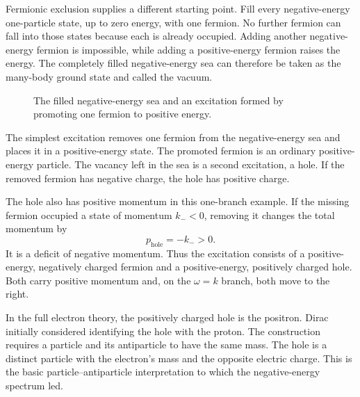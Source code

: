 Fermionic exclusion supplies a different starting point. Fill every negative-energy one-particle state, up to zero energy, with one fermion. No further fermion can fall into those states because each is already occupied. Adding another negative-energy fermion is impossible, while adding a positive-energy fermion raises the energy. The completely filled negative-energy sea can therefore be taken as the many-body ground state and called the vacuum.

\begin{figure}
\centering
{}
\caption{The filled negative-energy sea and an excitation formed by promoting one fermion to positive energy.}
\end{figure}

The simplest excitation removes one fermion from the negative-energy sea and places it in a positive-energy state. The promoted fermion is an ordinary positive-energy particle. The vacancy left in the sea is a second excitation, a hole. If the removed fermion has negative charge, the hole has positive charge.

The hole also has positive momentum in this one-branch example. If the missing fermion occupied a state of momentum \(k_-<0\), removing it changes the total momentum by
\begin{equation}
p_{\mathrm{hole}}=-k_->0.
\end{equation}
It is a deficit of negative momentum. Thus the excitation consists of a positive-energy, negatively charged fermion and a positive-energy, positively charged hole. Both carry positive momentum and, on the \(\omega=k\) branch, both move to the right.

In the full electron theory, the positively charged hole is the positron. Dirac initially considered identifying the hole with the proton. The construction requires a particle and its antiparticle to have the same mass. The hole is a distinct particle with the electron's mass and the opposite electric charge. This is the basic particle--antiparticle interpretation to which the negative-energy spectrum led.

